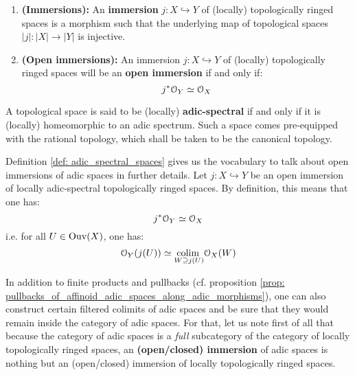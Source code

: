             \begin{definition} \label{def: immersions_of_topologically_ringed_spaces}
                \noindent
                \begin{enumerate}
                    \item \textbf{(Immersions):} An \textbf{immersion} $j: X \hookrightarrow Y$ of (locally) topologically ringed spaces is a morphism such that the underlying map of topological spaces $|j|: |X| \to |Y|$ is injective. 
                    \item \textbf{(Open immersions):} An immersion $j: X \hookrightarrow Y$ of (locally) topologically ringed spaces will be an \textbf{open immersion} if and only if:
                        $$j^*\mathcal{O}_Y \simeq \mathcal{O}_X$$
                \end{enumerate}
            \end{definition}
            
            \begin{definition} \label{def: adic_spectral_spaces}
                A topological space is said to be (locally) \textbf{adic-spectral} if and only if it is (locally) homeomorphic to an adic spectrum. Such a space comes pre-equipped with the rational topology, which shall be taken to be the canonical topology.
            \end{definition}
            \begin{remark} \label{remark: open_immersions_of_adic_spaces}
                Definition \ref{def: adic_spectral_spaces} gives us the vocabulary to talk about open immersions of adic spaces in further details. Let $j: X \hookrightarrow Y$ be an open immersion of locally adic-spectral topologically ringed spaces. By definition, this means that one has:
                    $$j^* \mathcal{O}_Y \simeq \mathcal{O}_X$$
                i.e. for all $U \in \mathrm{Ouv}(X)$, one has:
                    $$\mathcal{O}_Y(j(U)) \simeq \underset{W \supseteq j(U)}{\operatorname{colim} \:} \mathcal{O}_X(W)$$
            \end{remark}
            
            \begin{remark} \label{remark: closed_immersions_of_adic_spaces}
                
            \end{remark}
            
            In addition to finite products and pullbacks (cf. proposition \ref{prop: pullbacks_of_affinoid_adic_spaces_along_adic_morphisms}), one can also construct certain filtered colimits of adic spaces and be sure that they would remain inside the category of adic spaces. For that, let us note first of all that because the category of adic spaces is a \textit{full} subcategory of the category of locally topologically ringed spaces, an \textbf{(open/closed) immersion} of adic spaces is nothing but an (open/closed) immersion of locally topologically ringed spaces. 
            
